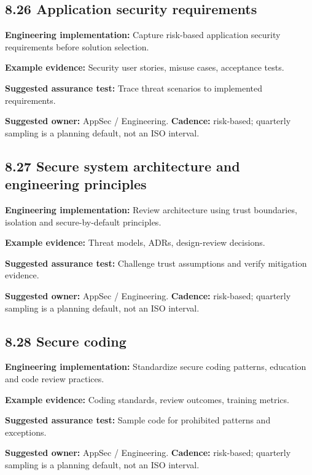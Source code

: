 \documentclass[11pt,letterpaper]{article}
\begin{document}
\subsection{8.26 Application security requirements}
\textbf{Engineering implementation:} Capture risk-based application security requirements before solution selection.\par
\textbf{Example evidence:} Security user stories, misuse cases, acceptance tests.\par
\textbf{Suggested assurance test:} Trace threat scenarios to implemented requirements.\par
\textbf{Suggested owner:} AppSec / Engineering. \textbf{Cadence:} risk-based; quarterly sampling is a planning default, not an ISO interval.\par
{}
\subsection{8.27 Secure system architecture and engineering principles}
\textbf{Engineering implementation:} Review architecture using trust boundaries, isolation and secure-by-default principles.\par
\textbf{Example evidence:} Threat models, ADRs, design-review decisions.\par
\textbf{Suggested assurance test:} Challenge trust assumptions and verify mitigation evidence.\par
\textbf{Suggested owner:} AppSec / Engineering. \textbf{Cadence:} risk-based; quarterly sampling is a planning default, not an ISO interval.\par
{}
\subsection{8.28 Secure coding}
\textbf{Engineering implementation:} Standardize secure coding patterns, education and code review practices.\par
\textbf{Example evidence:} Coding standards, review outcomes, training metrics.\par
\textbf{Suggested assurance test:} Sample code for prohibited patterns and exceptions.\par
\textbf{Suggested owner:} AppSec / Engineering. \textbf{Cadence:} risk-based; quarterly sampling is a planning default, not an ISO interval.\par
{}
\end{document}
